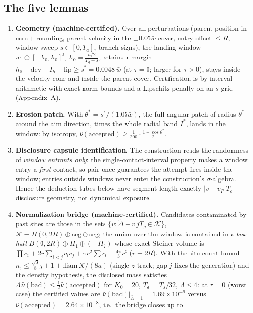 \documentclass[11pt]{article}
\newcommand{\Ts}{T_s}
\newcommand{\Ta}{T_a}
\newcommand{\Tg}{T_g}
\newcommand{\relL}{\bar\Lambda}
\newcommand{\wbar}{\bar w}
\begin{document}
\subsection{The five lemmas}
\begin{enumerate}
\item \textbf{Geometry (machine-certified).} Over all perturbations (parent
position in core${}+{}$rounding, parent velocity in the $\pm0.05\wbar$ cover,
entry offset $\le R$, window sweep $s\in[0,\Ta]$, branch signs), the landing
window $w_c\oplus[-h_0,h_0]^3$, $h_0=\frac{a/2}{\Tg-s}$, retains a margin
$h_0-\mathrm{dev}-I_h-\mathrm{lip}\ge s^*=0.0048\,\wbar$ (at $\tau=0$;
larger for $\tau>0$), stays inside the velocity cone and inside the parent
cover. Certification is by interval arithmetic with exact norm bounds and a
Lipschitz penalty on an $s$-grid (Appendix~A).
\item \textbf{Erosion patch.} With $\theta^*=s^*/(1.05\wbar)$, the full
angular patch of radius $\theta^*$ around the aim direction, times the whole
radial band $I^*$, lands in the window: by isotropy,
$\hat\nu(\text{accepted})\ge\frac{1}{200}\cdot\frac{1-\cos\theta^*}{2}$.
\item \textbf{Disclosure capsule identification.} The construction reads the
randomness of \emph{window entrants only}: the single-contact-interval
property makes a window entry a \emph{first} contact, so pair-once
guarantees the attempt fires inside the window; entries outside windows
never enter the construction's $\sigma$-algebra. Hence the deduction tubes
below have segment length exactly $|v-v_P|\Ta$ --- disclosure geometry, not
dynamical exposure.
\item \textbf{Normalization bridge (machine-certified).} Candidates
contaminated by past sites are those in the sets
$\{v: \tilde\Delta-v\,j\Tg\in\mathcal{K}\}$,
$\mathcal{K}=B(0,2R)\oplus\mathrm{seg}\oplus\mathrm{seg}$; the union over the
window is contained in a \emph{box-hull} $B(0,2R)\oplus H_1\oplus(-H_2)$
whose exact Steiner volume is
$\prod c_i+2r\sum_{i<j}c_ic_j+\pi r^2\sum c_i+\frac{4\pi}{3}r^3$ ($r=2R$).
With the site-count bound $n_j\le\frac{\sqrt3}{8}j+1+\mathrm{diam}\,
\mathcal{K}/(8a)$ (single $z$-track; gap $j$ fixes the generation) and the
density hypothesis, the disclosed mass satisfies
$\relL\,\hat\nu(\mathrm{bad})\le\tfrac12\hat\nu(\text{accepted})$ for
$K_0=20$, $\Ta=\Ts/32$, $\relL\le4$: at $\tau=0$ (worst case) the certified
values are $\hat\nu(\mathrm{bad})|_{\relL=1}=1.69\times10^{-9}$ versus
$\hat\nu(\text{accepted})=2.64\times10^{-8}$, i.e.\ the bridge closes up to

\end{enumerate}
\end{document}
